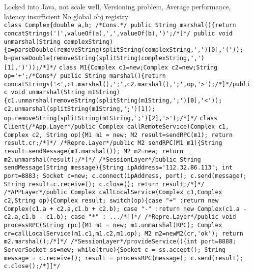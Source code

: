 \btext{--:}
Locked into Java,
not scale well,
Versioning problem,
Average performance,
latency insufficient
No global obj registry
\\
\lstinline{class Complex{double a,b; /*Cons.*/ public String marshal(){return concatStrings('(',valueOf(a),',',valueOf(b),')';/*]*/ public void unmarshal(String complexString){a=parseDouble(removeString(splitString(complexString,',')[0],'(')); b=parseDouble(removeString(splitString(complexString,',')[1],')'));/*]*/}
\lstinline{class M1{Complex c1=new;Complex c2=new;String op='+';/*Cons*/ public String marshal(){return concatStrings('<',c1.marshal(),';',c2.marshal(),';',op,'>');/*]*/public void unmarshal(String m1String){c1.unmarshal(removeString(splitString(m1String,';')[0],'<')); c2.unmarshal(splitString(m1String,';')[1]); op=removeString(splitString(m1String,';')[2],'>');/*]*/}
\lstinline{class Client{/*App.Layer*/public Complex callRemoteService(Complex c1, Complex c2, String op){M1 m1 = new; M2 result=sendRPC(m1); return result.cr;/*]*/ /*Repre.Layer*/public M2 sendRPC(M1 m1){String result=sendMessage(m1.marshal()); M2 m2=new; return m2.unmarshal(result);/*]*/ /*SessionLayer*/public String sendMessage(String message){String ipAddress='112.32.86.113'; int port=8883; Socket c=new; c.connect(ipAddress, port); c.send(message); String result=c.receive(); c.close(); return result;/*]*/}
\lstinline{/*APPLayer*/public Complex callLocalService(Complex c1,Complex c2,String op){Complex result; switch(op){case "+" :return new Complex(c1.a + c2.a,c1.b + c2.b); case "-" :return new Complex(c1.a - c2.a,c1.b - c1.b); case "*" : .../*]]*/ /*Repre.Layer*/public void processRPC(String rpc){M1 m1 = new; m1.unmarshal(RPC); Complex cr=callLocalService(m1.c1,m1.c2,m1.op); M2 m2=newM2(cr,'ok'); return m2.marshal();/*]*/ /*SessionLayer*/provideService(){int port=8888; ServerSocket ss=new; while(true){Socket c = ss.accept(); String message = c.receive(); result = processRPC(message); c.send(result); c.close();/*]]*/}
